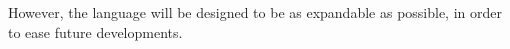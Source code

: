 \documentclass{sigchi}
\begin{document}
However, the language will be designed to be as expandable as possible, in order to ease future developments.

%
%
%
%
%
\balance



\end{document}
